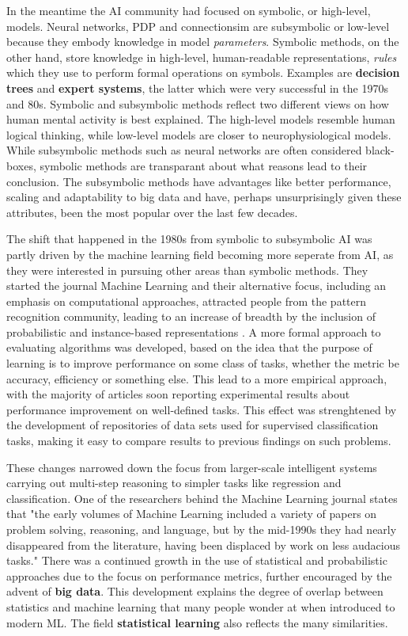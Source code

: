 \documentclass[twoside,english]{uiofysmaster}
\begin{document}
In the meantime the AI community had focused on symbolic, or high-level, models. Neural networks, PDP and connectionsim are subsymbolic or low-level because they embody knowledge in model \textit{parameters}. Symbolic methods, on the other hand, store knowledge in high-level, human-readable representations, \textit{rules} which they use to perform formal operations on symbols. Examples are \textbf{decision trees} and \textbf{expert systems}, the latter which were very successful in the 1970s and 80s.
Symbolic and subsymbolic methods reflect two different views on how human mental activity is best explained. The high-level models resemble human logical thinking, while low-level models are closer to neurophysiological models.
While subsymbolic methods such as neural networks are often considered black-boxes, symbolic methods are transparant about what reasons lead to their conclusion. The subsymbolic methods have advantages like better performance, scaling and adaptability to big data and have, perhaps unsurprisingly given these attributes, been the most popular over the last few decades.

The shift that happened in the 1980s from symbolic to subsymbolic AI was partly driven by the machine learning field becoming more seperate from AI, as they were interested in pursuing other areas than symbolic methods. They started the journal Machine Learning and their alternative focus, including an emphasis on computational approaches, attracted people from the pattern recognition community,  leading to an increase of breadth by the inclusion of probabilistic and instance-based representations \cite{Langley2011}. A more formal approach to evaluating algorithms was developed, based on the idea that the purpose of learning is to improve performance on some class of tasks, whether the metric be accuracy, efficiency or something else. This lead to a more empirical approach, with the majority of articles soon reporting experimental results about performance improvement on well-defined tasks. This effect was strenghtened by the development of repositories of data sets used for supervised classification tasks, making it easy to compare results to previous findings on such problems.

These changes narrowed down the focus from larger-scale intelligent systems carrying out multi-step reasoning to simpler tasks like regression and classification. One of the researchers behind the Machine Learning journal states that "the early volumes of Machine Learning included a variety of papers on problem solving, reasoning, and language, but by the mid-1990s they had nearly disappeared from the literature, having been displaced by work on less audacious tasks." There was a continued growth in the use of statistical and probabilistic approaches due to the focus on performance metrics, further encouraged by the advent of \textbf{big data}. This development explains the degree of overlap between statistics and machine learning that many people wonder at when introduced to modern ML. The field \textbf{statistical learning} also reflects the many similarities.
\end{document}
